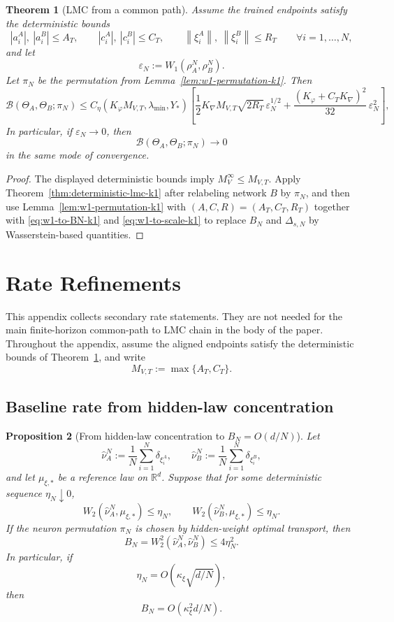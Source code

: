 \documentclass[11pt]{article}
\newtheorem{theorem}{Theorem}
\newtheorem{proposition}[theorem]{Proposition}
\theoremstyle{definition}
\newcommand{\R}{\mathbb{R}}
\newcommand{\norm}[1]{\left\lVert #1 \right\rVert}
\newcommand{\cB}{\mathcal{B}}
\begin{document}
\begin{theorem}[LMC from a common path]
\label{thm:lmc-from-common-path-k1}
Assume the trained endpoints satisfy the deterministic bounds
\[
  |a_i^A|,\ |a_i^B|\le A_T,
  \qquad
  |c_i^A|,\ |c_i^B|\le C_T,
  \qquad
  \norm{\xi_i^A},\ \norm{\xi_i^B}\le R_T
  \qquad
  \forall i=1,\dots,N,
\]
and let
\[
  \varepsilon_N:=W_1(\rho_A^N,\rho_B^N).
\]
Let $\pi_N$ be the permutation from Lemma~\ref{lem:w1-permutation-k1}. Then
\begin{equation}
  \cB(\Theta_A,\Theta_B;\pi_N)
  \le
  C_\eta(K_\varphi M_{V,T},\lambda_{\min},Y_\ast)
  \left[
    \frac12 K_{\nabla}M_{V,T}\sqrt{2R_T}\,\varepsilon_N^{1/2}
    +
    \frac{(K_\varphi+C_TK_{\nabla})^2}{32}\,\varepsilon_N^2
  \right],
  \label{eq:lmc-common-path-bound-k1}
\end{equation}
In particular, if $\varepsilon_N\to 0$, then
\[
  \cB(\Theta_A,\Theta_B;\pi_N)\to 0
\]
in the same mode of convergence.
\end{theorem}

\begin{proof}
The displayed deterministic bounds imply $M_V^\infty\le M_{V,T}$. Apply
Theorem~\ref{thm:deterministic-lmc-k1} after relabeling network $B$ by
$\pi_N$, and then use Lemma~\ref{lem:w1-permutation-k1} with
$(A,C,R)=(A_T,C_T,R_T)$ together with \eqref{eq:w1-to-BN-k1} and
\eqref{eq:w1-to-scale-k1} to
replace $B_N$ and $\Delta_{s,N}$ by Wasserstein-based quantities.
\end{proof}

\section{Rate Refinements}

This appendix collects secondary rate statements. They are not needed for the
main finite-horizon common-path to LMC chain in the body of the paper.
Throughout the appendix, assume the aligned endpoints satisfy the deterministic
bounds of Theorem~\ref{thm:lmc-from-common-path-k1}, and write
\[
  M_{V,T}:=\max\{A_T,C_T\}.
\]

\subsection{Baseline rate from hidden-law concentration}

\begin{proposition}[From hidden-law concentration to $B_N=O(d/N)$]
\label{prop:BN-from-w2-k1}
Let
\[
  \hat\nu_A^N:=\frac1N\sum_{i=1}^N \delta_{\xi_i^A},
  \qquad
  \hat\nu_B^N:=\frac1N\sum_{i=1}^N \delta_{\xi_i^B},
\]
and let $\mu_{\xi,\ast}$ be a reference law on $\R^d$. Suppose that for some
deterministic sequence $\eta_N\downarrow 0$,
\[
  W_2(\hat\nu_A^N,\mu_{\xi,\ast})\le \eta_N,
  \qquad
  W_2(\hat\nu_B^N,\mu_{\xi,\ast})\le \eta_N.
\]
If the neuron permutation $\pi_N$ is chosen by hidden-weight optimal transport,
then
\begin{equation}
  B_N = W_2^2(\hat\nu_A^N,\hat\nu_B^N)\le 4\eta_N^2.
  \label{eq:BN-via-w2-k1}
\end{equation}
In particular, if
\[
  \eta_N=O(\kappa_\xi\sqrt{d/N}),
\]
then
\[
  B_N=O(\kappa_\xi^2 d/N).
\]
\end{proposition}
\end{document}
